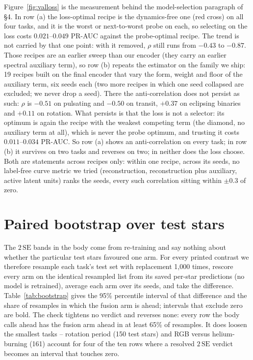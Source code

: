 \documentclass{article}
\begin{document}
Figure~\ref{fig:valloss} is the measurement behind the model-selection paragraph of \S4. In row (a)
the loss-optimal recipe is the dynamics-free one (red cross) on all four tasks, and it is the worst or
next-to-worst probe on each, so selecting on the loss costs $0.021$--$0.049$ PR-AUC against the
probe-optimal recipe. The trend is not carried by that one point: with it removed, $\rho$ still runs
from $-0.43$ to $-0.87$. Those recipes are an earlier sweep than our encoder (they carry an
earlier spectral auxiliary term), so row (b) repeats the estimator on the family we ship: 19 recipes
built on the final encoder that vary the form, weight and floor of the auxiliary term, six seeds each
(two more recipes in which one seed collapsed are excluded; we never drop a seed). There the
anti-correlation does not persist as such: $\rho$ is $-0.51$ on pulsating and $-0.50$ on transit,
$+0.37$ on eclipsing binaries and $+0.11$ on rotation. What persists is that the loss is not a
selector: its optimum is again the recipe with the weakest competing term (the diamond, no auxiliary
term at all), which is never the probe optimum, and trusting it costs $0.011$--$0.034$ PR-AUC. So
row (a) shows an anti-correlation on every task; in row (b) it survives on two tasks and reverses on
two; in neither does the loss choose. Both are statements across recipes only: within one recipe, across its seeds, no label-free
curve metric we tried (reconstruction, reconstruction plus auxiliary, active latent units) ranks the
seeds, every such correlation sitting within $\pm 0.3$ of zero.

\section{Paired bootstrap over test stars}
\label{app:bootstrap}

The $2\,\mathrm{SE}$ bands in the body come from re-training and say nothing about whether the
particular test stars favoured one arm. For every printed contrast we therefore resample each task's
test set with replacement 1{,}000 times, rescore every arm on the identical resampled list from its
saved per-star predictions (no model is retrained), average each arm over its seeds, and take the
difference. Table~\ref{tab:bootstrap} gives the 95\% percentile interval of that difference and the
share of resamples in which the fusion arm is ahead; intervals that exclude zero are bold. The check
tightens no verdict and reverses none: every row the body calls ahead has the fusion arm ahead in at
least 65\% of resamples. It does loosen the smallest tasks -- rotation period (150 test stars) and
RGB versus helium-burning (161) account for four of the ten rows where a resolved $2\,\mathrm{SE}$
verdict becomes an interval that touches zero.
\end{document}
